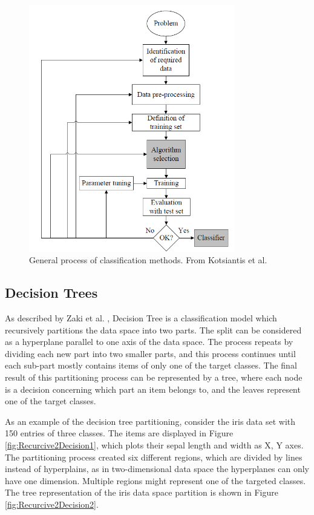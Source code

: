\begin{figure}[!h]
    \includegraphics[width=0.8\textwidth]{images/chapter2/supervisedLearning.png}  
    \caption{General process of classification methods. From Kotsiantis et al. \cite{Kotsiantis2007}}
    \label{fig:supervisedLearning}
\end{figure}

\subsection{Decision Trees}

As described by Zaki et al. \cite{Zaki2014}, Decision Tree is a classification model which recursively partitions the data space into two parts. The split can be considered as a hyperplane parallel to one axis of the data space. The process repeats by dividing each new part into two smaller parts, and this process continues until each sub-part mostly contains items of only one of the target classes. The final result of this partitioning process
can be represented by a tree, where each node is a decision concerning which part an item belongs to, and the leaves represent one of the target classes.


As an example of the decision tree partitioning, consider the iris data set with 150 entries of three classes. The items are displayed in Figure \ref{fig:Recurcive2Decision1}, which plots their sepal length and width as X, Y axes. The partitioning process created six different regions, which are divided by lines instead of hyperplains, as in two-dimensional data space the hyperplanes can only have one dimension. Multiple regions might represent one of the targeted classes. The tree representation of the iris data space partition is shown in Figure \ref{fig:Recurcive2Decision2}.

